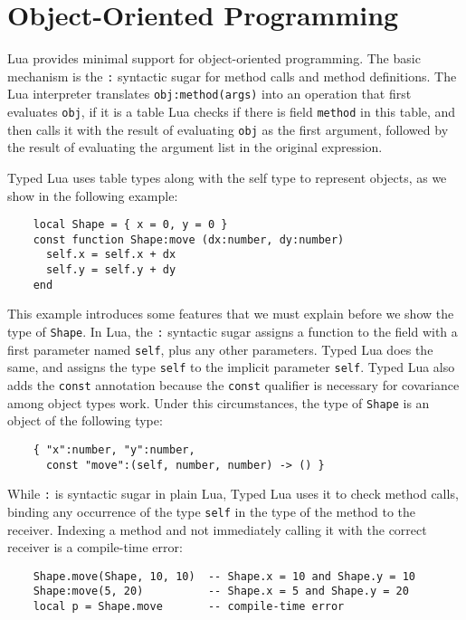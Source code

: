 \section{Object-Oriented Programming}

Lua provides minimal support for object-oriented programming.
The basic mechanism is the \texttt{:} syntactic sugar for method
calls and method definitions.
The Lua interpreter translates \texttt{obj:method(args)} into
an operation that first evaluates \texttt{obj}, if it is a table
Lua checks if there is field \texttt{method} in this table,
and then calls it with the result of evaluating \texttt{obj} as
the first argument, followed by the result of evaluating the
argument list in the original expression.

Typed Lua uses table types along with the self type to
represent objects, as we show in the following example:
\begin{verbatim}
    local Shape = { x = 0, y = 0 }
    const function Shape:move (dx:number, dy:number)
      self.x = self.x + dx
      self.y = self.y + dy
    end
\end{verbatim}

This example introduces some features that we must explain
before we show the type of \texttt{Shape}.
In Lua, the \texttt{:} syntactic sugar assigns a function to the
field with a first parameter named \texttt{self}, plus any other
parameters.
Typed Lua does the same, and assigns the type \texttt{self} to the
implicit parameter \texttt{self}.
Typed Lua also adds the \texttt{const} annotation because the
\texttt{const} qualifier is necessary for covariance among object types work.
Under this circumstances, the type of \texttt{Shape} is an object of
the following type:
\begin{verbatim}
    { "x":number, "y":number,
      const "move":(self, number, number) -> () }
\end{verbatim}

While \texttt{:} is syntactic sugar in plain Lua, Typed Lua uses it
to check method calls, binding any occurrence of the type \texttt{self}
in the type of the method to the receiver.
Indexing a method and not immediately calling it with the correct
receiver is a compile-time error:
\begin{verbatim}
    Shape.move(Shape, 10, 10)  -- Shape.x = 10 and Shape.y = 10
    Shape:move(5, 20)          -- Shape.x = 5 and Shape.y = 20
    local p = Shape.move       -- compile-time error
\end{verbatim}

